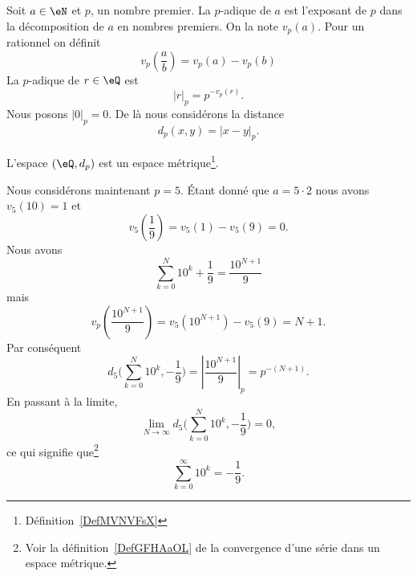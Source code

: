 Soit \( a\in \eN\) et \( p\), un nombre premier. La  \( p\)-adique de \( a\) est l'exposant de \( p\) dans la décomposition de \( a\) en nombres premiers. On la note \( v_p(a)\). Pour un rationnel on définit
\begin{equation}
    v_p\left( \frac{ a }{ b } \right)=v_p(a)-v_p(b)
\end{equation}
La  \( p\)-adique de \( r\in \eQ\) est
\begin{equation}
    | r |_p=p^{-v_p(r)}.
\end{equation}
Nous posons \( | 0 |_p=0\). De là nous considérons la distance
\begin{equation}
    d_p(x,y)=| x-y |_p.
\end{equation}

\begin{lemma}
    L'espace \( (\eQ,d_p)\) est un espace métrique\footnote{Définition~\ref{DefMVNVFsX}}.
\end{lemma}

Nous considérons maintenant \( p=5\). Étant donné que \( a=5\cdot 2\) nous avons \( v_5(10)=1\) et
\begin{equation}
    v_5\left( \frac{1}{ 9 } \right)=v_5(1)-v_5(9)=0.
\end{equation}
Nous avons
\begin{equation}
    \sum_{k=0}^N10^k+\frac{1}{ 9 }=\frac{ 10^{N+1} }{ 9 }
\end{equation}
mais
\begin{equation}
    v_p\left( \frac{ 10^{N+1} }{ 9 } \right)=v_5(10^{N+1})-v_5(9)=N+1.
\end{equation}
Par conséquent
\begin{equation}
    d_5\big( \sum_{k=0}^N10^k,-\frac{1}{ 9 } \big)=| \frac{ 10^{N+1} }{ 9 } |_p=p^{-(N+1)}.
\end{equation}
En passant à la limite,
\begin{equation}
    \lim_{N\to \infty} d_5\big( \sum_{k=0}^N10^k,-\frac{1}{ 9 } \big)=0,
\end{equation}
ce qui signifie que\footnote{Voir la définition~\ref{DefGFHAaOL} de la convergence d'une série dans un espace métrique.}
\begin{equation}
    \sum_{k=0}^{\infty}10^k=-\frac{1}{ 9 }.
\end{equation}
